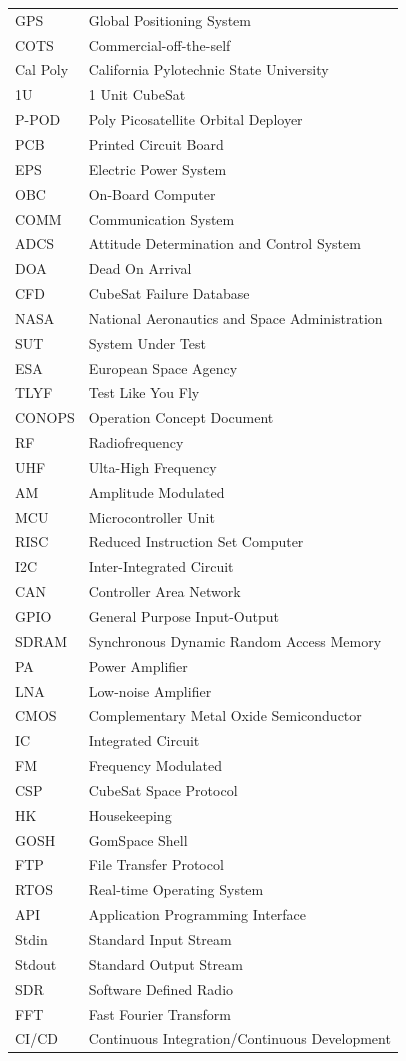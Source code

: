 \documentclass[english,12pt,a4paper,pdftex,elec,utf8]{aaltothesis}
\begin{document}
\begin{tabular}{ll}
GPS 	& Global Positioning System \\
COTS 	& Commercial-off-the-self \\
Cal Poly	& California Pylotechnic State University \\
1U 		& 1 Unit CubeSat \\
P-POD	& Poly Picosatellite Orbital Deployer \\
PCB 	& Printed Circuit Board \\
EPS      & Electric Power System \\
OBC 	& On-Board Computer \\
COMM 	& Communication System \\
ADCS 	& Attitude Determination and Control System \\
DOA 	& Dead On Arrival \\
CFD 	& CubeSat Failure Database \\
NASA 	& National Aeronautics and Space Administration \\
SUT 	& System Under Test \\
ESA 	& European Space Agency \\
TLYF 	& Test Like You Fly \\
CONOPS 	& Operation Concept Document \\
RF 		& Radiofrequency \\
UHF 	& Ulta-High Frequency \\
AM 		& Amplitude Modulated \\
MCU 	& Microcontroller Unit \\
RISC 	& Reduced Instruction Set Computer \\
I2C 	& Inter-Integrated Circuit \\
CAN 	& Controller Area Network \\
GPIO 	& General Purpose Input-Output \\
SDRAM 	& Synchronous Dynamic Random Access Memory \\
PA	 	& Power Amplifier \\
LNA 	& Low-noise Amplifier \\
CMOS 	& Complementary Metal Oxide Semiconductor \\
IC 		& Integrated Circuit \\
FM 		& Frequency Modulated \\
CSP 	& CubeSat Space Protocol \\
HK 		& Housekeeping \\
GOSH 	& GomSpace Shell \\
FTP 	& File Transfer Protocol \\
RTOS 	& Real-time Operating System \\
API 	& Application Programming Interface \\
Stdin 	& Standard Input Stream \\
Stdout 	& Standard Output Stream \\
SDR		& Software Defined Radio \\
FFT 	& Fast Fourier Transform \\
CI/CD 	& Continuous Integration/Continuous Development

\end{tabular}
\end{document}
